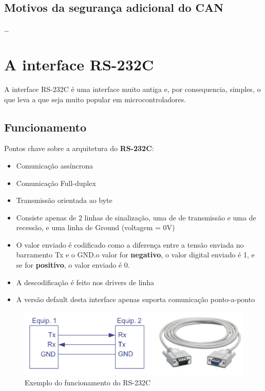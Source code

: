 \documentclass[a4paper, 12pt, onecolumn, oneside]{scrartcl}
\begin{document}
\subsection{Motivos da segurança adicional do CAN}
\dots

\section{A interface RS-232C}
A interface RS-232C é uma interface muito antiga e, por consequencia, simples, o que leva a que seja muito popular em microcontroladores. 

\subsection{Funcionamento}
Pontos chave sobre a arquitetura do \textbf{RS-232C}:\@
\begin{itemize}
    \item Comunicação assíncrona
    \item Comunicação Full-duplex
    \item Transmissão orientada ao byte
    \item Consiste apenas de 2 linhas de sinalização, uma de de transmissão e uma de recessão, e uma linha de Ground (voltagem = 0V)
    \item O valor enviado é codificado como a diferença entre a tensão enviada no barramento Tx e o GND.\@Se o valor for \textbf{negativo}, o valor digital enviado é 1, e se for \textbf{positivo}, o valor enviado é 0. 
    \item A descodificação é feito nos drivers de linha 
    \item A versão default desta interface apenas suporta comunicação ponto-a-ponto
\end{itemize}

\begin{figure}[H]
    \centering
    \includegraphics[width=1\textwidth]{Funcionamento_RS-232C.png}
    \caption{Exemplo do funcionamento do RS-232C}\label{fig6}
\end{figure}
\end{document}
